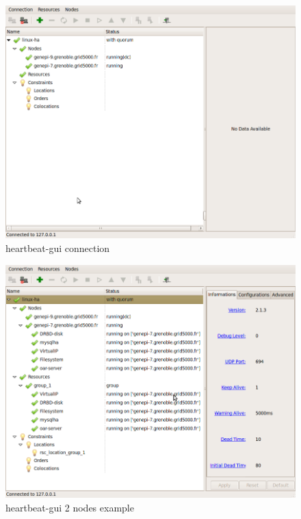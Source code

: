\documentclass[a4paper,10pt]{report}
\begin{document}
\begin{figure}
\includegraphics[scale=0.5]{schema/hb_gui-2nodes-connect.png}
\caption{heartbeat-gui connection} 
\label{hb-gui-connect} 
\end{figure}

\begin{figure}
\includegraphics[scale=0.5]{schema/hb_gui-2nodes.png}
\caption{heartbeat-gui 2 nodes example} 
\label{hb-gui-2nodes} 
\end{figure}
\end{document}

